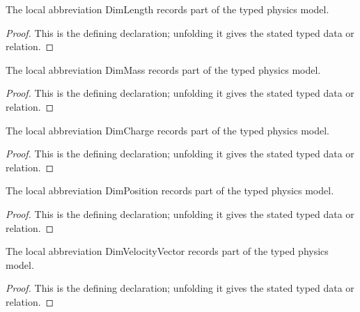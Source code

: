 \begin{definition}[DimLength]
  \label{decl:physics:IPhO_2026_1_B_2:DimLength}
  The local abbreviation DimLength records part of the typed physics model.
\end{definition}
\begin{proof}
  This is the defining declaration; unfolding it gives the stated typed data or relation.
\end{proof}

\begin{definition}[DimMass]
  \label{decl:physics:IPhO_2026_1_B_2:DimMass}
  The local abbreviation DimMass records part of the typed physics model.
\end{definition}
\begin{proof}
  This is the defining declaration; unfolding it gives the stated typed data or relation.
\end{proof}

\begin{definition}[DimCharge]
  \label{decl:physics:IPhO_2026_1_B_2:DimCharge}
  The local abbreviation DimCharge records part of the typed physics model.
\end{definition}
\begin{proof}
  This is the defining declaration; unfolding it gives the stated typed data or relation.
\end{proof}

\begin{definition}[DimPosition]
  \label{decl:physics:IPhO_2026_1_B_2:DimPosition}
  The local abbreviation DimPosition records part of the typed physics model.
\end{definition}
\begin{proof}
  This is the defining declaration; unfolding it gives the stated typed data or relation.
\end{proof}

\begin{definition}[DimVelocityVector]
  \label{decl:physics:IPhO_2026_1_B_2:DimVelocityVector}
  The local abbreviation DimVelocityVector records part of the typed physics model.
\end{definition}
\begin{proof}
  This is the defining declaration; unfolding it gives the stated typed data or relation.
\end{proof}

